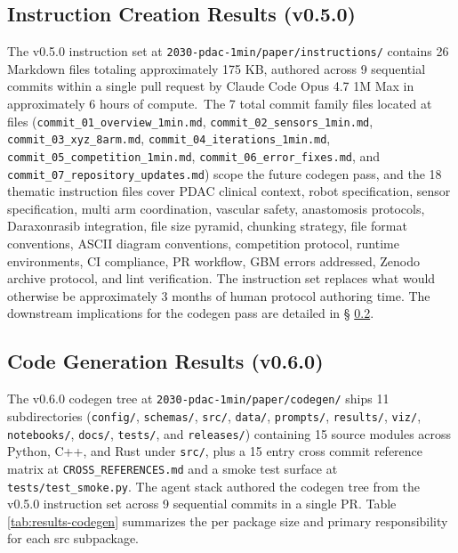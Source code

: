 
\subsection{Instruction Creation Results (v0.5.0)}
\label{sec:results-instructions}

The v0.5.0 instruction set at
\texttt{2030-pdac-1min/paper/instructions/} contains 26 Markdown
files totaling approximately 175 KB, authored across 9 sequential
commits within a single pull request by Claude Code Opus 4.7 1M
Max in approximately 6 hours of compute.\ The 7 total commit family files located at files
(\texttt{commit_01_overview_1min.md},
\texttt{commit_02_sensors_1min.md},
\texttt{commit_03_xyz_8arm.md},
\texttt{commit_04_iterations_1min.md},
\texttt{commit_05_competition_1min.md},
\texttt{commit_06_error_fixes.md}, and
\texttt{commit_07_repository_updates.md}) scope the future codegen
pass, and the 18 thematic instruction files cover PDAC clinical
context, robot specification, sensor specification, multi arm
coordination, vascular safety, anastomosis protocols, Daraxonrasib
integration, file size pyramid, chunking strategy, file format
conventions, ASCII diagram conventions, competition protocol,
runtime environments, CI compliance, PR workflow, GBM errors
addressed, Zenodo archive protocol, and lint verification. The
instruction set replaces what would otherwise be approximately 3
months of human protocol authoring time. The downstream
implications for the codegen pass are detailed in \S
\ref{sec:results-codegen}.

\subsection{Code Generation Results (v0.6.0)}
\label{sec:results-codegen}

The v0.6.0 codegen tree at \texttt{2030-pdac-1min/paper/codegen/}
ships 11 subdirectories (\texttt{config/}, \texttt{schemas/},
\texttt{src/}, \texttt{data/}, \texttt{prompts/}, \texttt{results/},
\texttt{viz/}, \texttt{notebooks/}, \texttt{docs/},
\texttt{tests/}, and \texttt{releases/}) containing 15 source
modules across Python, C++, and Rust under \texttt{src/}, plus a
15 entry cross commit reference matrix at
\texttt{CROSS_REFERENCES.md} and a smoke test surface at
\texttt{tests/test_smoke.py}. The agent stack \cite{claude-code,
claude-opus-47} authored the codegen tree from the v0.5.0
instruction set across 9 sequential commits in a single PR. Table
\ref{tab:results-codegen} summarizes the per package size and
primary responsibility for each src subpackage.

